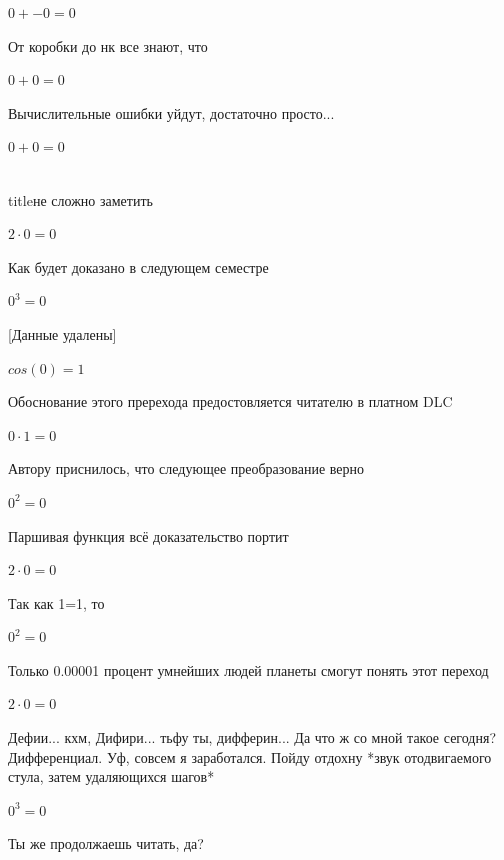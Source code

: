 \documentclass[12pt,a4paper,fleqn]{article}
\begin{document}
\begin{center}$0+-0 = 0$\end{center}
От коробки до нк все знают, что

\begin{center}$0+0 = 0$\end{center}
Вычислительные ошибки уйдут, достаточно просто...

\begin{center}$0+0 = 0$\end{center}
\\ title{не сложно заметить} 

\begin{center}$2 \cdot 0 = 0$\end{center}
Как будет доказано в следующем семестре

\begin{center}$0^{3} = 0$\end{center}
[Данные удалены]

\begin{center}$cos(0) = 1$\end{center}
Обоснование этого пререхода предостовляется читателю в платном DLC

\begin{center}$0 \cdot 1 = 0$\end{center}
Автору приснилось, что следующее преобразование верно

\begin{center}$0^{2} = 0$\end{center}
Паршивая функция всё доказательство портит\cite{link2}

\begin{center}$2 \cdot 0 = 0$\end{center}
Так как 1=1, то\cite{link4}

\begin{center}$0^{2} = 0$\end{center}
Только 0.00001 процент умнейших людей планеты смогут понять этот переход

\begin{center}$2 \cdot 0 = 0$\end{center}
Дефии... кхм, Дифири... тьфу ты, дифферин... Да что ж со мной такое сегодня? Дифференциал. Уф, совсем я заработался. Пойду отдохну *звук отодвигаемого стула, затем удаляющихся шагов*

\begin{center}$0^{3} = 0$\end{center}
Ты же продолжаешь читать, да?
\end{document}
